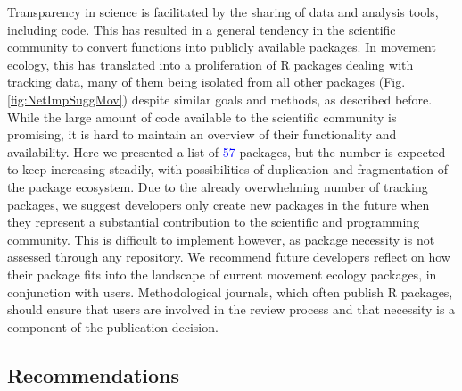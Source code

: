 \documentclass[a4paper,12pt]{article}
\begin{document}
{Transparency in science is facilitated by the sharing of data and analysis tools, including code. This has resulted in a general tendency in the scientific community to convert functions into publicly available packages. %
In movement ecology, this has translated into a proliferation of R packages dealing with tracking data, many of them being isolated from all other packages (Fig. \ref{fig:NetImpSuggMov}) despite similar goals and methods, as described before. While the large amount of code available to the scientific community is promising, it is hard to maintain an overview of their functionality and availability. Here we presented a list of \textcolor{blue}{57} packages, but the number is expected to keep increasing steadily, with possibilities of duplication and fragmentation of the package ecosystem. Due to the already overwhelming number of tracking packages, we suggest developers only create new packages in the future when they represent a substantial contribution to the scientific and programming community. This is difficult to implement however, as package necessity is not assessed through any repository. %
We recommend future developers reflect on how their package fits into the landscape of current movement ecology packages, in conjunction with users. Methodological journals, which often publish R packages, should ensure that users are involved in the review process and that necessity is a component of the publication decision.

\subsection*{Recommendations}

}
\end{document}

